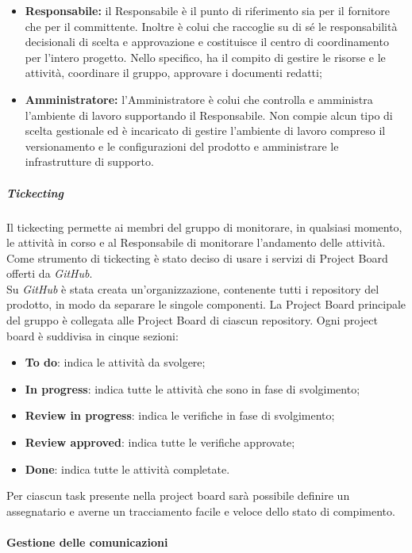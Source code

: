 \begin{itemize}
   				\item \textbf{Responsabile:} il Responsabile è il punto di riferimento sia per il fornitore che per il committente. Inoltre è colui che raccoglie su di sé le responsabilità decisionali di scelta e approvazione e costituisce il centro di coordinamento per l'intero progetto. Nello specifico, ha il compito di gestire le risorse e le attività, coordinare il gruppo, approvare i documenti redatti;
   				\item \textbf{Amministratore:} l'Amministratore è colui che controlla e amministra l'ambiente di lavoro supportando il Responsabile. Non compie alcun tipo di scelta gestionale ed è incaricato di gestire  l'ambiente di lavoro compreso il versionamento e le configurazioni del prodotto e amministrare le infrastrutture di supporto.
   			\end{itemize}

   		\subparagraph*{Tickecting}
   		Il tickecting permette ai membri del gruppo di monitorare, in qualsiasi momento, le attività in corso e al Responsabile di monitorare l'andamento delle attività.\\
   		\noindent Come strumento di tickecting è stato deciso di usare i servizi di Project Board offerti da \textit{GitHub\glos}.\\
   		Su \textit{GitHub\glo} è stata creata un'organizzazione, contenente tutti i repository del prodotto, in modo da separare le singole componenti.
   		La Project Board principale del gruppo è collegata alle Project Board di ciascun repository.
   		Ogni project board è suddivisa in cinque sezioni:
   		\begin{itemize}
   			\item \textbf{To do}: indica le attività da svolgere;
   			\item \textbf{In progress}: indica tutte le attività che sono in fase di svolgimento;
   			\item \textbf{Review in progress}: indica le verifiche in fase di svolgimento;
   			\item \textbf{Review approved}: indica tutte le verifiche approvate;
   			\item \textbf{Done}: indica tutte le attività completate.
   		\end{itemize}
   		Per ciascun task presente nella project board sarà possibile definire un assegnatario e averne un tracciamento facile e veloce dello stato di compimento.


   	\paragraph{Gestione delle comunicazioni}

